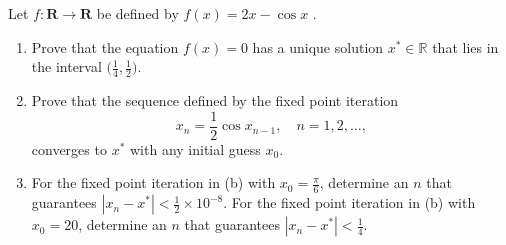 \begin{exercise}
\label{applied:2021:3}
Let $f : \mathbf { R } \to \mathbf { R }$ be defined by $f ( x ) = 2 x - \cos x$ .
\begin{enumerate}
\item[(a)] Prove that the equation $f(x) = 0$ has a unique solution $x^* \in \mathbb{R}$ that lies in the interval $\bigl(\frac{1}{4},\frac{1}{2}\bigr)$.
\item[(b)] Prove that the sequence defined by the fixed point iteration
\[
x_{n} = \frac{1}{2}\cos x_{n-1}, \quad n = 1,2,\dots,
\]
converges to $x^*$ with any initial guess $x_0$.
\item[(c)] For the fixed point iteration in (b) with $x_0 = \frac{\pi}{6}$, determine an $n$ that guarantees $|x_n - x^*| < \frac{1}{2} \times 10^{-8}$. For the fixed point iteration in (b) with $x_0 = 20$, determine an $n$ that guarantees $|x_n - x^*| < \frac{1}{4}$.
\end{enumerate}
\end{exercise}

